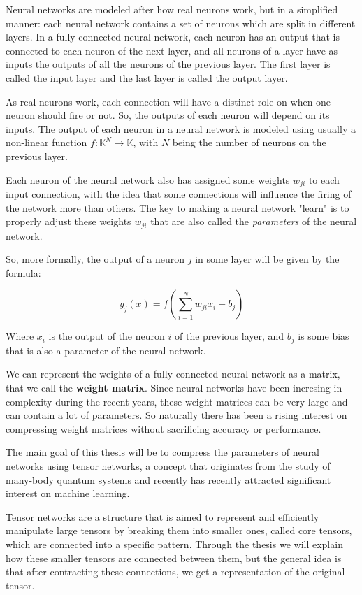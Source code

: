 \documentclass[11pt,a4paper,openright,oneside]{book}
\numberwithin{equation}{section}
\begin{document}
Neural networks are modeled after how real neurons work, but in a simplified manner: each neural network contains a set of neurons which are split in
different layers. In a fully connected neural network, each neuron has an output that is connected to each neuron of the next layer, and all neurons of a layer
have as inputs the outputs of all the neurons of the previous layer. The first layer is called the input layer and the last layer is called the output layer.

As real neurons work, each connection will have a distinct role on when one neuron should fire or not. So, the outputs of each neuron will depend on its inputs. The output of each neuron in
a neural network is modeled using usually a non-linear function $f : \mathbb{K}^N \rightarrow \mathbb{K}$,
with $N$ being the number of neurons on the previous layer.

Each neuron of the neural network also has assigned some weights $w_{ji}$ to each input connection, with the idea that
some connections will influence the firing of the network more than others. The key to making a neural network "learn" is
to properly adjust these weights $w_{ji}$ that are also called the \textit{parameters} of the neural network.

So, more formally, the output of a neuron $j$ in some layer will be given by the formula:

$$ y_j(x) = f\left(\sum_{i=1}^N w_{ji} x_i + b_{j}\right) $$ 

Where $x_{i}$ is the output of the neuron $i$ of the previous layer, and $b_j$ is some bias that is also a parameter of the neural network.

We can represent the weights of a fully connected neural network as a matrix, that we call the \textbf{weight matrix}.
Since neural networks have been incresing in complexity during the recent years, these weight matrices can be very large
and can contain a lot of parameters. So naturally there has been a rising interest on compressing weight matrices without sacrificing accuracy or performance.

The main goal of this thesis will be to compress the parameters of neural networks using tensor networks, a concept 
that originates from the study of many-body quantum systems \cite{orusTensorNetworksComplex2019}
and recently has recently attracted significant interest on machine learning.

Tensor networks are a structure that is aimed to represent and efficiently manipulate large tensors by breaking them into
smaller ones, called core tensors, which are connected into a specific pattern. Through the thesis we will explain how
these smaller tensors are connected between them, but the general idea is that after contracting these connections,
we get a representation of the original tensor.
\end{document}
